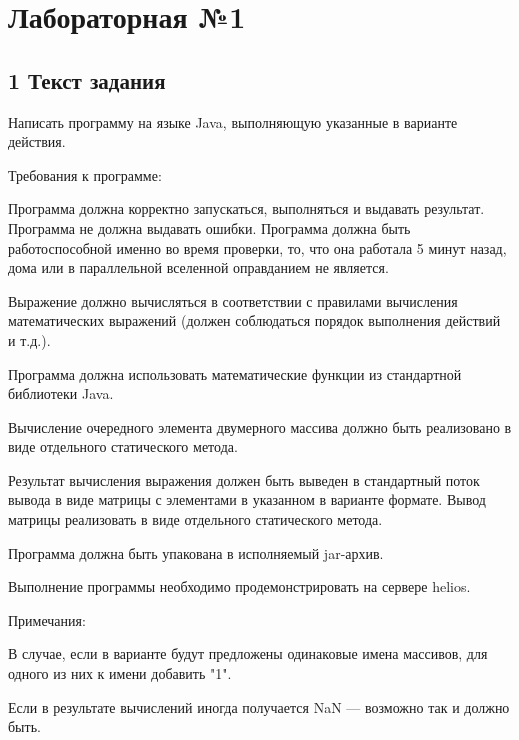 



\setlength\baselineskip{13.4pt} 
\setlength\parskip{6pt}
\setlength\parindent{0pt}
\abovedisplayskip=6pt %
\belowdisplayskip=6pt %
\raggedright          %

\section{Лабораторная №1}

\subsection{1 Текст задания}

Написать программу на языке Java, выполняющую указанные в варианте действия.

{\ital Требования к программе:}
\begin{list*}[][\#]
\item Программа должна корректно запускаться, выполняться и выдавать результат. Программа не должна выдавать ошибки. Программа должна быть работоспособной именно во время проверки, то, что она работала 5 минут назад, дома или в параллельной вселенной оправданием не является.
\item Выражение должно вычисляться в соответствии с правилами вычисления математических выражений {\ital\color{desc} (должен соблюдаться порядок выполнения действий и т.д.)}.
\item Программа должна использовать математические функции из стандартной библиотеки Java.
\item Вычисление очередного элемента двумерного массива должно быть реализовано в виде отдельного статического метода.
\item Результат вычисления выражения должен быть выведен в стандартный поток вывода в виде матрицы с элементами в указанном в варианте формате. Вывод матрицы реализовать в виде отдельного статического метода.
\item Программа должна быть упакована в исполняемый jar-архив.
\item Выполнение программы необходимо продемонстрировать на сервере helios.
\end{list*}
{\ital Примечания:}
\begin{list*}[][\#]
\item В случае, если в варианте будут предложены одинаковые имена массивов, для одного из них к имени добавить "1".
\item Если в результате вычислений иногда получается NaN --- возможно так и должно быть.
\end{list*}

